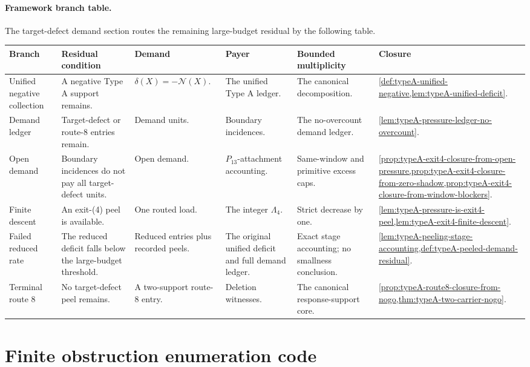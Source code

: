 \documentclass[11pt]{article}
\newcommand{\No}{\mathcal N}
\newcommand{\FrameworkBranchTableHeader}{%
\toprule
\textbf{Branch} & \textbf{Residual condition} & \textbf{Demand} & \textbf{Payer} & \textbf{Bounded multiplicity} & \textbf{Closure}\\
\midrule
}
\begin{document}
\paragraph{Framework branch table.}
The target-defect demand section routes the remaining large-budget residual by
the following table.
\begin{longtable}{L{0.13\textwidth} L{0.19\textwidth} L{0.14\textwidth} L{0.14\textwidth} L{0.17\textwidth} L{0.17\textwidth}}
\FrameworkBranchTableHeader
Unified negative collection
&
A negative Type A support remains.
&
\(\delta(X)=-\No(X)\).
&
The unified Type A ledger.
&
The canonical decomposition.
&
\cref{def:typeA-unified-negative,lem:typeA-unified-deficit}.
\\
\addlinespace
Demand ledger
&
Target-defect or route-8 entries remain.
&
Demand units.
&
Boundary incidences.
&
The no-overcount demand ledger.
&
\cref{lem:typeA-pressure-ledger-no-overcount}.
\\
\addlinespace
Open demand
&
Boundary incidences do not pay all target-defect units.
&
Open demand.
&
\(P_{13}\)-attachment accounting.
&
Same-window and primitive excess caps.
&
\cref{prop:typeA-exit4-closure-from-open-pressure,prop:typeA-exit4-closure-from-zero-shadow,prop:typeA-exit4-closure-from-window-blockers}.
\\
\addlinespace
Finite descent
&
An exit-\textup{(4)} peel is available.
&
One routed load.
&
The integer \(\Lambda_4\).
&
Strict decrease by one.
&
\cref{lem:typeA-pressure-is-exit4-peel,lem:typeA-exit4-finite-descent}.
\\
\addlinespace
Failed reduced rate
&
The reduced deficit falls below the large-budget threshold.
&
Reduced entries plus recorded peels.
&
The original unified deficit and full demand ledger.
&
Exact stage accounting; no smallness conclusion.
&
\cref{lem:typeA-peeling-stage-accounting,def:typeA-peeled-demand-residual}.
\\
\addlinespace
Terminal route 8
&
No target-defect peel remains.
&
A two-support route-8 entry.
&
Deletion witnesses.
&
The canonical response-support core.
&
\cref{prop:typeA-route8-closure-from-nogo,thm:typeA-two-carrier-nogo}.
\\
\bottomrule
\end{longtable}


\appendix

\section{Finite obstruction enumeration code}\label{app:curv-code}
\end{document}
